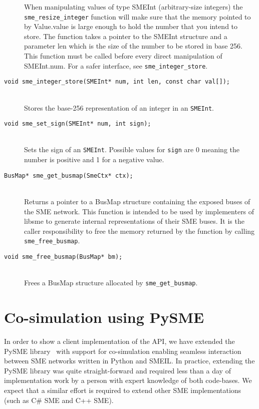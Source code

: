 \begin{description}
   When manipulating values of type SMEInt (arbitrary-size integers) the
   \texttt{sme_resize_integer} function will make sure that the memory pointed
   to by Value.value is large enough to hold the number that you intend to
   store. The function takes a pointer to the SMEInt structure and a parameter
   len which is the size of the number to be stored in base 256. This function
   must be called before every direct manipulation of SMEInt.num. For a safer
   interface, see \texttt{sme_integer_store}.
 \item[\texttt{void sme_integer_store(SMEInt* num, int len, const char val[]);}]\hfill\\
   Stores the base-256 representation of an integer in an \texttt{SMEInt}.
 \item[\texttt{void sme_set_sign(SMEInt* num, int sign);}]\hfill\\
   Sets the sign of an \texttt{SMEInt}. Possible values for \texttt{sign} are 0
   meaning the number is positive and 1 for a negative value.
 \item[\texttt{BusMap* sme_get_busmap(SmeCtx* ctx);}]\hfill\\
   Returns a pointer to a BusMap structure containing the exposed buses of the
   SME network. This function is intended to be used by implementers of libsme
   to generate internal representations of their SME buses. It is the caller
   responsibility to free the memory returned by the function by calling
   \texttt{sme_free_busmap}.
\item[\texttt{void sme_free_busmap(BusMap* bm);}]\hfill\\
   Frees a BusMap structure allocated by \texttt{sme_get_busmap}.
\end{description}

\section{Co-simulation using PySME}
In order to show a client implementation of the API, we have extended the PySME
library~\cite{pysme} with support for co-simulation enabling seamless
interaction between SME networks written in Python and SMEIL. In practice,
extending the PySME library was quite straight-forward and required less than a
day of implementation work by a person with expert knowledge of both
code-bases. We expect that a similar effort is required to extend other SME
implementations (such as C\# SME and C++ SME).


